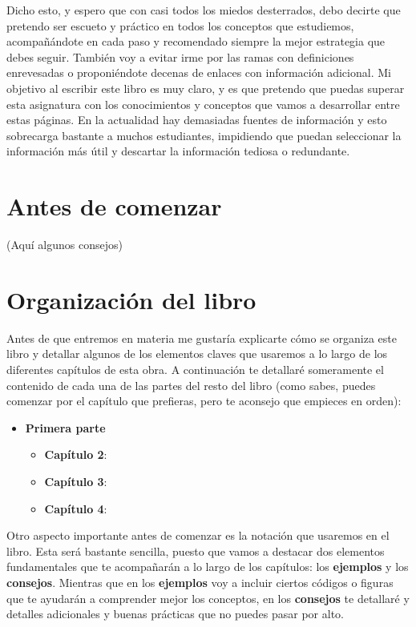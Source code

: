 Dicho esto, y espero que con casi todos los miedos desterrados, debo decirte que pretendo ser escueto y práctico en todos los 
conceptos que estudiemos, acompañándote en cada paso y recomendado siempre la mejor estrategia que debes seguir. También voy a evitar
irme por las ramas con definiciones enrevesadas o proponiéndote decenas de enlaces con información adicional. Mi objetivo al escribir
este libro es muy claro, y es que pretendo que puedas superar esta asignatura con los conocimientos y conceptos que vamos a desarrollar
entre estas páginas. En la actualidad hay demasiadas fuentes de información y esto sobrecarga bastante a muchos estudiantes, impidiendo 
que puedan seleccionar la información más útil y descartar la información tediosa o redundante. 

\section{Antes de comenzar}

(Aquí algunos consejos)

\section{Organización del libro}

Antes de que entremos en materia me gustaría explicarte cómo se organiza este libro y detallar algunos de los elementos claves que
usaremos a lo largo de los diferentes capítulos de esta obra. A continuación te detallaré someramente el contenido de cada
una de las partes del resto del libro (como sabes, puedes comenzar por el capítulo que prefieras, pero te aconsejo que empieces 
en orden):

\begin{itemize}
    \item \textbf{Primera parte} {
        \begin{itemize}
            \item \textbf{Capítulo 2}: 
            \item \textbf{Capítulo 3}: 
            \item \textbf{Capítulo 4}: 
        \end{itemize}
        }

\end{itemize}

Otro aspecto importante antes de comenzar es la notación que usaremos en el libro. Esta será bastante sencilla, puesto que vamos
a destacar dos elementos fundamentales que te acompañarán a lo largo de los capítulos: los \textbf{ejemplos} y los \textbf{consejos}. Mientras que
en los \textbf{ejemplos} voy a incluir ciertos códigos o figuras que te ayudarán a comprender mejor los conceptos, en los \textbf{consejos} te detallaré
y detalles adicionales y buenas prácticas que no puedes pasar por alto.

